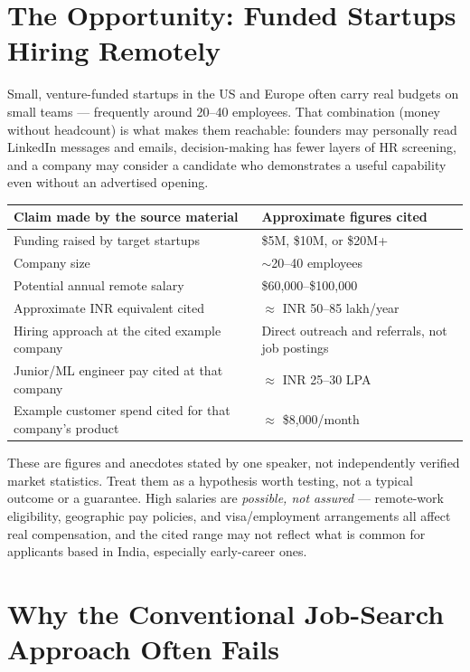 \section{The Opportunity: Funded Startups Hiring Remotely}

Small, venture-funded startups in the US and Europe often carry real budgets on small teams --- frequently
around 20--40 employees. That combination (money without headcount) is what makes them reachable: founders may
personally read LinkedIn messages and emails, decision-making has fewer layers of HR screening, and a company may
consider a candidate who demonstrates a useful capability even without an advertised opening.

\begin{longtable}{p{} p{}}
\toprule
\textbf{Claim made by the source material} & \textbf{Approximate figures cited} \\
\midrule
\endhead
Funding raised by target startups & \$5M, \$10M, or \$20M+ \\
Company size & $\sim$20--40 employees \\
Potential annual remote salary & \$60,000--\$100,000 \\
Approximate INR equivalent cited & $\approx$ INR 50--85 lakh/year \\
Hiring approach at the cited example company & Direct outreach and referrals, not job postings \\
Junior/ML engineer pay cited at that company & $\approx$ INR 25--30 LPA \\
Example customer spend cited for that company's product & $\approx$ \$8,000/month \\
\bottomrule
\end{longtable}

\begin{caution}
These are figures and anecdotes stated by one speaker, not independently verified market statistics.
Treat them as a hypothesis worth testing, not a typical outcome or a guarantee. High salaries are
\emph{possible, not assured} --- remote-work eligibility, geographic pay policies, and visa/employment
arrangements all affect real compensation, and the cited range may not reflect what is common for applicants
based in India, especially early-career ones.
\end{caution}

\section{Why the Conventional Job-Search Approach Often Fails}


